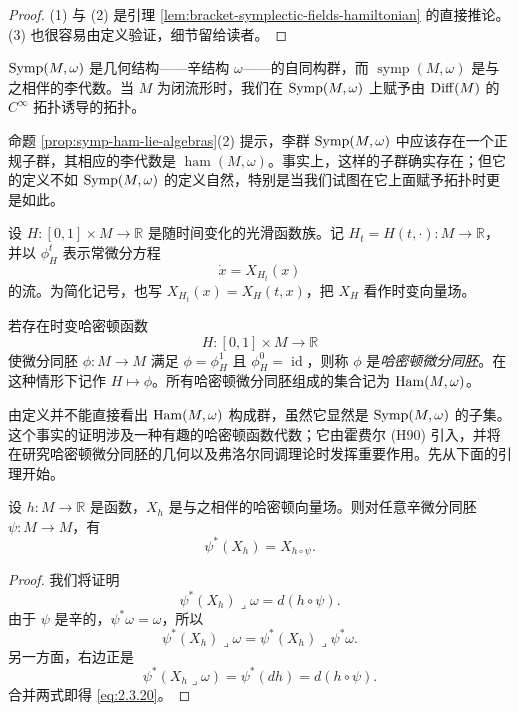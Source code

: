 \begin{proof}
(1) 与 (2) 是引理 \ref{lem:bracket-symplectic-fields-hamiltonian} 的直接推论。(3) 也很容易由定义验证，细节留给读者。
\end{proof}

$\operatorname{Symp}(M,\omega)$ 是几何结构——辛结构 $\omega$——的自同构群，而 $\operatorname{symp}(M,\omega)$ 是与之相伴的李代数。当 $M$ 为闭流形时，我们在 $\operatorname{Symp}(M,\omega)$ 上赋予由 $\operatorname{Diff}(M)$ 的 $C^\infty$ 拓扑诱导的拓扑。

命题 \ref{prop:symp-ham-lie-algebras}(2) 提示，李群 $\operatorname{Symp}(M,\omega)$ 中应该存在一个正规子群，其相应的李代数是 $\operatorname{ham}(M,\omega)$。事实上，这样的子群确实存在；但它的定义不如 $\operatorname{Symp}(M,\omega)$ 的定义自然，特别是当我们试图在它上面赋予拓扑时更是如此。

设
$H:[0,1]\times M\to\mathbb R$ 是随时间变化的光滑函数族。记
$H_t=H(t,\mathord\cdot):M\to\mathbb R$，并以 $\phi_H^t$ 表示常微分方程
\[
  \dot x=X_{H_t}(x)
\]
的流。为简化记号，也写 $X_{H_t}(x)=X_H(t,x)$，把 $X_H$ 看作时变向量场。

\begin{definition}
\label{def:hamiltonian-diffeomorphism}
若存在时变哈密顿函数
\[
  H:[0,1]\times M\longrightarrow\mathbb R
\]
使微分同胚 $\phi:M\to M$ 满足 $\phi=\phi_H^1$ 且 $\phi_H^0=\operatorname{id}$，则称 $\phi$ 是\emph{哈密顿微分同胚}。在这种情形下记作 $H\mapsto\phi$。所有哈密顿微分同胚组成的集合记为 $\operatorname{Ham}(M,\omega)$。
\end{definition}

由定义并不能直接看出 $\operatorname{Ham}(M,\omega)$ 构成群，虽然它显然是 $\operatorname{Symp}(M,\omega)$ 的子集。这个事实的证明涉及一种有趣的哈密顿函数代数；它由霍费尔 (H90) 引入，并将在研究哈密顿微分同胚的几何以及弗洛尔同调理论时发挥重要作用。先从下面的引理开始。

\begin{lemma}
\label{lem:symplectic-pullback-hamiltonian-field}
设 $h:M\to\mathbb R$ 是函数，$X_h$ 是与之相伴的哈密顿向量场。则对任意辛微分同胚 $\psi:M\to M$，有
\[
  \psi^*(X_h)=X_{h\circ\psi}.
\]
\end{lemma}

\begin{proof}
我们将证明
\begin{equation}
  \psi^*(X_h)\mathbin{\lrcorner}\omega=d(h\circ\psi).
  \label{eq:2.3.20}
\end{equation}
由于 $\psi$ 是辛的，$\psi^*\omega=\omega$，所以
\[
  \psi^*(X_h)\mathbin{\lrcorner}\omega
  =\psi^*(X_h)\mathbin{\lrcorner}\psi^*\omega.
\]
另一方面，右边正是
\[
  \psi^*(X_h\mathbin{\lrcorner}\omega)
  =\psi^*(dh)=d(h\circ\psi).
\]
合并两式即得 \eqref{eq:2.3.20}。
\end{proof}

